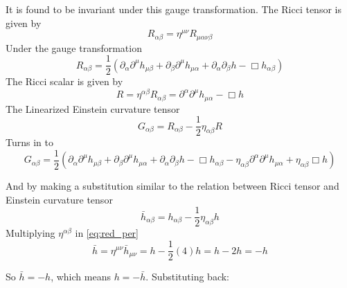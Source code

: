 \documentclass[12pt, a4paper]{article}
\theoremstyle{plain}
\theoremstyle{definition}
\theoremstyle{remark}
\begin{document}
It is found to be invariant under this gauge transformation. The Ricci tensor is given by
\begin{equation}
    R_{\alpha \beta}=\eta^{\mu \nu}R_{\mu \alpha \nu \beta}
\end{equation}
Under the gauge transformation
\begin{equation}
    R_{\alpha \beta}=\frac{1}{2}({\partial_\alpha}{\partial^\mu}h_{\mu \beta}+{\partial_\beta}{\partial^\mu}h_{\mu \alpha}+{\partial_\alpha}{\partial_\beta}h-\Box{h_{\alpha \beta}})
\end{equation}
The Ricci scalar is given by
\begin{equation}
    R=\eta^{\alpha \beta}R_{\alpha \beta}={\partial^\alpha}{\partial^\mu}h_{\mu \alpha}-\Box{h}
\end{equation}
The Linearized Einstein curvature tensor  
\begin{equation}
    G_{\alpha \beta}=R_{\alpha \beta}-\frac{1}{2}\eta_{\alpha \beta}R
\end{equation}
Turns in to
\begin{equation}
    G_{\alpha \beta}=\frac{1}{2}({\partial_\alpha}{\partial^\mu}h_{\mu \beta}+{\partial_\beta}{\partial^\mu}h_{\mu \alpha}+{\partial_\alpha}{\partial_\beta}h-\Box{h_{\alpha \beta}} -\eta_{\alpha \beta}{\partial^\alpha}{\partial^\mu}h_{\mu \alpha}+\eta_{\alpha \beta}\Box{h})
\end{equation}

And by making a substitution similar to the relation between Ricci tensor and Einstein curvature tensor
\begin{equation}
    \bar h_{\alpha \beta}=h_{\alpha \beta}-\frac{1}{2}\eta_{\alpha \beta}h
    \label{eq:red_per}
\end{equation}
Multiplying  $\eta^{\alpha \beta}$  in \eqref{eq:red_per}
\begin{equation}
    \bar{h} = \eta^{\mu\nu}\bar{h}_{\mu\nu} = h - \frac{1}{2}(4)h = h - 2h = -h
\end{equation}

So $\bar{h} = -h$, which means $h = -\bar{h}$. Substituting back:
\end{document}
